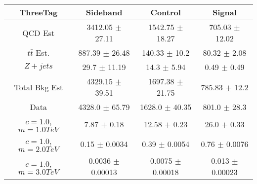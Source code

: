 \begin{footnotesize} 
\begin{tabular}{c|c|c|c} 
ThreeTag & Sideband & Control & Signal \\ 
\hline\hline 
QCD Est & 3412.05 $\pm$ 27.11 & 1542.75 $\pm$ 18.27 & 705.03 $\pm$ 12.02\\ 
$t\bar{t}$ Est.  & 887.39 $\pm$ 26.48 & 140.33 $\pm$ 10.2 & 80.32 $\pm$ 2.08\\ 
$Z+jets$ & 29.7 $\pm$ 11.19 & 14.3 $\pm$ 5.94 & 0.49 $\pm$ 0.49\\ 
Total Bkg Est & 4329.15 $\pm$ 39.51 & 1697.38 $\pm$ 21.75 & 785.83 $\pm$ 12.2\\ 
Data & 4328.0 $\pm$ 65.79 & 1628.0 $\pm$ 40.35 & 801.0 $\pm$ 28.3\\ 
$c=1.0$,$m=1.0TeV$ & 7.87 $\pm$ 0.18 & 12.58 $\pm$ 0.23 & 26.0 $\pm$ 0.33\\ 
$c=1.0$,$m=2.0TeV$ & 0.15 $\pm$ 0.0034 & 0.39 $\pm$ 0.0054 & 0.76 $\pm$ 0.0076\\ 
$c=1.0$,$m=3.0TeV$ & 0.0036 $\pm$ 0.00013 & 0.0075 $\pm$ 0.00018 & 0.013 $\pm$ 0.00023\\ 
\hline\hline 
\end{tabular} 
\end{footnotesize} 
\newline 
